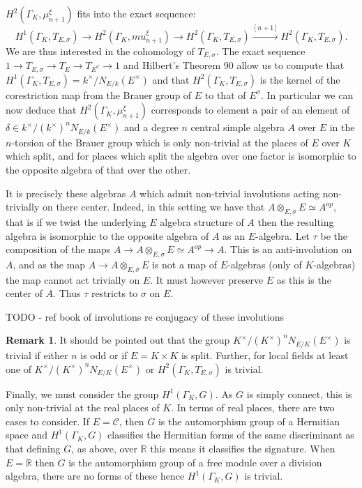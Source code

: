 \documentclass{article}
\theoremstyle{plain}
\theoremstyle{definition}
\newtheorem{remark}[theorem]{Remark}
\newcommand{\C}{\mathcal{C}}
\newcommand{\RR}{\mathbb{R}}
\newcommand{\GalKbK}{\Gamma_K}
\begin{document}
\begin{itemize}
$H^2(\GalKbK, \mu_{n+1}^\xi)$ fits into the exact sequence:
\[ H^1(\GalKbK, T_{E,\sigma}) \rightarrow H^2(\GalKbK, mu_{n+1}^\xi) \rightarrow H^2(\GalKbK, T_{E,\sigma}) \overset{[n+1]}\rightarrow H^2(\GalKbK, T_{E,\sigma}). \]
We are thus interested in the cohomology of $T_{E,\sigma}$.
The exact sequence $1 \rightarrow T_{E,\sigma} \rightarrow T_E \rightarrow T_{E^\sigma} \rightarrow 1$ and Hilbert's Theorem 90 allow us to compute that 
$H^1(\GalKbK, T_{E,\sigma}) = k^\times/N_{E/k}(E^\times)$ and that $H^2(\GalKbK, T_{E,\sigma})$ is the kernel of the corestriction map from the Brauer group of $E$ to that of $E^\sigma$.
In particular we can now deduce that $H^2(\GalKbK, \mu_{n+1}^\xi)$ corresponds to element a pair of an element of $\delta\in k^\times/(k^\times)^nN_{E/k}(E^\times)$ and a degree $n$ central simple algebra $A$ over $E$ in the $n$-torsion of the Brauer group which is only non-trivial at the places of $E$ over $K$ which split, and for places which split the algebra over one factor is isomorphic to the opposite algebra of that over the other.

It is precisely these algebras $A$ which admit non-trivial involutions acting non-trivially on there center.
Indeed, in this setting we have that $A \otimes_{E,\sigma} E \simeq A^{op}$, that is if we twist the underlying $E$ algebra structure of $A$ then the resulting algebra is isomorphic to the opposite algebra of $A$ as an $E$-algebra. Let $\tau$ be the composition of the maps $A \rightarrow A \otimes_{E,\sigma} E \simeq A^{op} \rightarrow A$. This is an anti-involution on $A$, and as the map $A \rightarrow A \otimes_{E,\sigma} E $ is not a map of $E$-algebras (only of $K$-algebras) the map cannot act trivially on $E$. It must however preserve $E$ as this is the center of $A$. Thus $\tau$ restricts to $\sigma$ on $E$.

TODO - ref book of involutions re conjugacy of these involutions

\begin{remark}
It should be pointed out that the group $K^\times/(K^\times)^nN_{E/K}(E^\times)$ is trivial if either $n$ is odd or if $E = K\times K$ is split.
Further, for local fields at least one of $K^\times/(K^\times)^nN_{E/K}(E^\times)$ or $H^2(\GalKbK, T_{E,\sigma}) $ is trivial.
\end{remark} 

Finally, we must consider the group $H^1(\GalKbK,G)$. As $G$ is simply connect, this is only non-trivial at the real places of $K$.
In terms of real places, there are two cases to consider.
If $E=\C$, then $G$ is the automorphism group of a Hermitian space and $H^1(\GalKbK,G)$ classifies the Hermitian forms of the same discriminant as that defining $G$, as above, over $\RR$ this means it classifies the signature.
When $E=\RR$ then $G$ is the automorphism group of a free module over a division algebra, there are no forms of these hence $H^1(\GalKbK,G)$ is trivial. 


\end{itemize}
\end{document}
